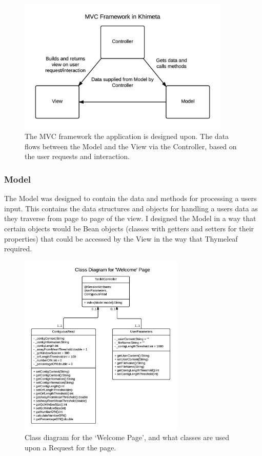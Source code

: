 \begin{figure}[H]
\centering
\includegraphics[width=0.9\textwidth]{images/mvcframework}
\caption{The MVC framework the application is designed upon. The data flows between the Model and the View via the Controller, based on the user requests and interaction.}
\end{figure}

\subsubsection{Model}
The Model was designed to contain the data and methods for processing a users input. This contains the data structures and objects for handling a users data as they traverse from page to page of the view. I designed the Model in a way that certain objects would be Bean objects (classes with getters and setters for their properties) that could be accessed by the View in the way that Thymeleaf required.

\begin{figure}[H]
\centering
\includegraphics[width=0.7\textwidth]{images/umlwelcomepage}
\caption{Class diagram for the `Welcome Page', and what classes are used upon a Request for the page.}
\end{figure}

